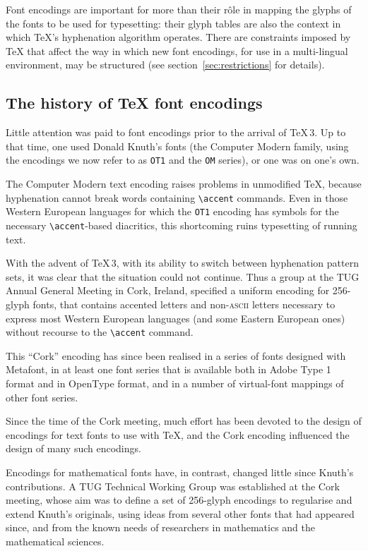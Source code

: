 \documentclass{ltxguide}[1994/11/20]
\providecommand{\Enc}[1]{\texttt{#1}}
\begin{document}
Font encodings are important for more than their r\^{o}le in mapping the
glyphs of the fonts to be used for typesetting: their glyph tables are
also the context in which \TeX{}'s hyphenation algorithm operates.
There are constraints imposed by \TeX{} that affect the way in which
new font encodings, for use in a multi-lingual environment, may be
structured (see section~\ref{sec:restrictions} for details).

\subsection{The history of \TeX{} font encodings}

Little attention was paid to font encodings prior to the arrival of
\TeX{}\,3.  Up to that time, one used Donald Knuth's fonts (the
Computer Modern family, using the encodings we now refer to as \Enc{OT1} and
the \Enc{OM} series), or one was on one's own.

The Computer Modern text encoding raises problems in unmodified
\TeX{}, because hyphenation cannot break words containing
\verb"\accent" commands.  Even in those Western European languages for
which the \Enc{OT1} encoding has symbols for the necessary
\verb"\accent"-based diacritics, this shortcoming ruins typesetting of
running text.

With the advent of \TeX{}\,3, with its ability to switch between
hyphenation pattern sets, it was clear that the situation could not
continue.  Thus a group at the TUG Annual General Meeting in Cork,
Ireland, specified a uniform encoding for 256-glyph fonts, that
contains accented letters and non-\textsc{ascii} letters necessary to
express most Western European languages (and some Eastern European ones)
without recourse to the \verb"\accent" command.

This ``Cork'' encoding has since been realised in a series of fonts
designed with Metafont, in at least one font series that is available
both in Adobe Type 1 format and in OpenType format, %
and in a number of virtual-font mappings of other font series.

Since the time of the Cork meeting, much effort has been devoted to
the design of encodings for text fonts to use with \TeX{}, and the
Cork encoding influenced the design of many such encodings.

Encodings for mathematical fonts have, in contrast, changed little
since Knuth's contributions.  A TUG Technical Working Group was
established at the Cork meeting, whose aim was to define a set of
256-glyph encodings to regularise and extend Knuth's originals, using
ideas from several other fonts that had appeared since, and from the
known needs of researchers in mathematics and the mathematical sciences.
\end{document}
